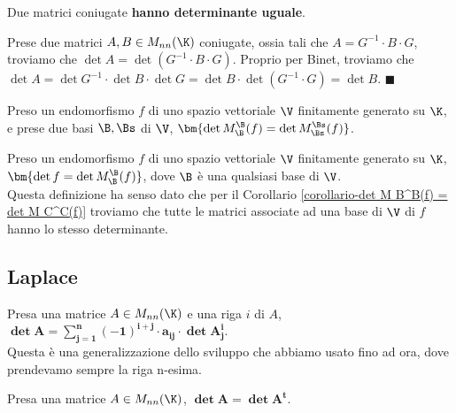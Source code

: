 \documentclass[11pt, a4paper, titlepage, oneside]{scrbook}
\begin{document}
\begin{Proposizione}[Proposizione]
\label{propos-matrici-coniugate-stesso-determinante}
Due matrici coniugate \textbf{hanno determinante uguale}.
\end{Proposizione}

\Dimostrazione \nopagebreak

Prese due matrici $A,B \in M_{nn}(\K)$ coniugate, ossia tali che $A = G^{-1} \cdot B \cdot G$, troviamo che $\det A = \det (G^{-1} \cdot B \cdot G)$. Proprio per Binet, troviamo che \mbox{$\det A = \det G^{-1} \cdot \det B \cdot \det G = \det B \cdot \det (G^{-1} \cdot G) = \det B$}. $\blacksquare$

\begin{Proposizione}[Corollario]
\label{corollario-det M B^B(f) = det M C^C(f)}
Preso un endomorfismo $f$ di uno spazio vettoriale $\V$ finitamente generato su $\K$, e prese due basi $\B, \Bs$ di $\V$, $\bm{\det M_\B^\B(f) = \det M_\Bs^\Bs(f)}$.
\end{Proposizione}

\begin{Definizione}
\label{def-determinante app lineare}
Preso un endomorfismo $f$ di uno spazio vettoriale $\V$ finitamente generato su $\K$, $\bm{\det f = \det M_\B^\B(f)}$, dove $\B$ è una qualsiasi base di $\V$. \\
Questa definizione ha senso dato che per il Corollario \ref{corollario-det M B^B(f) = det M C^C(f)} troviamo che tutte le matrici associate ad una base di $\V$ di $f$ hanno lo stesso determinante. 
\end{Definizione}

\subsection{Laplace}

\begin{Definizione}
\label{def-sviluppo di Laplace riga}
Presa una matrice $A \in M_{nn}(\K)$ e una riga $i$ di $A$, $\bm{\det A = \sum_{j = 1}^n (-1)^{i+j} \cdot a_{ij} \cdot \det A_j^i}$. \\
\NB Questa è una generalizzazione dello sviluppo che abbiamo usato fino ad ora, dove prendevamo sempre la riga n-esima. 
\end{Definizione}

\begin{Proposizione}[]
\label{propos-det A = det A^t}
Presa una matrice $A \in M_{nn}(\K)$, $\bm{\det A = \det A^t}$.
\end{Proposizione}
\end{document}
